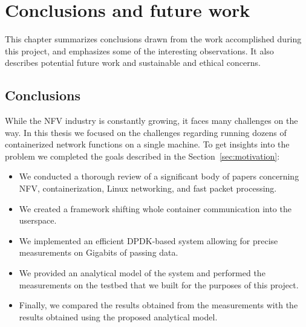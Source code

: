 \documentclass[english]{kththesis}
\begin{document}

\cleardoublepage
\chapter{Conclusions and future work}
\label{ch:conclusionsAndFutureWork}
This chapter summarizes conclusions drawn from the work accomplished during this project, and emphasizes some of the interesting observations. It also describes potential future work and sustainable and ethical concerns.

\section{Conclusions}
While the NFV industry is constantly growing, it faces many challenges on the way. In this thesis we focused on the challenges regarding running dozens of containerized network functions on a single machine. To get insights into the problem we completed the goals described in the Section~\ref{sec:motivation}:
\begin{itemize}
    \item We conducted a thorough review of a significant body of papers concerning NFV, containerization, Linux networking, and fast packet processing.
    \item We created a framework shifting whole container communication into the userspace.
    \item We implemented an efficient DPDK-based system allowing for precise measurements on Gigabits of passing data.
    \item We provided an analytical model of the system and performed the measurements on the testbed that we built for the purposes of this project. 
    \item Finally, we compared the results obtained from the measurements with the results obtained using the proposed analytical model.
\end{itemize}
\end{document}
